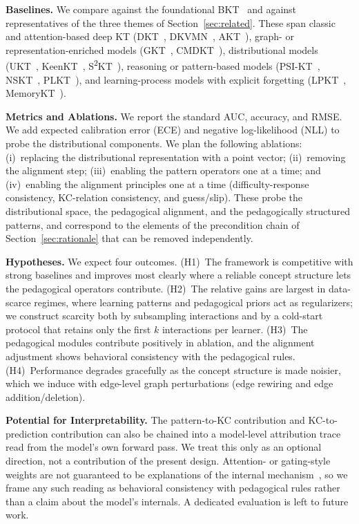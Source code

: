 \documentclass[conference]{IEEEtran}
\begin{document}
\textbf{Baselines.} We compare against the foundational BKT~\cite{corbett1994kt} and against representatives of the three themes of Section~\ref{sec:related}. These span classic and attention-based deep KT (DKT~\cite{piech2015dkt}, DKVMN~\cite{zhang2017dkvmn}, AKT~\cite{ghosh2020akt}), graph- or representation-enriched models (GKT~\cite{nakagawa2019gkt}, CMDKT~\cite{xia2025cmdkt}), distributional models (UKT~\cite{chen2025ukt}, KeenKT~\cite{li2025keenkt}, S\textsuperscript{2}KT~\cite{wu2026sskt}), reasoning or pattern-based models (PSI-KT~\cite{zhou2024psikt}, NSKT~\cite{hooshyar2026nskt}, PLKT~\cite{wu2026plkt}), and learning-process models with explicit forgetting (LPKT~\cite{shen2021lpkt}, MemoryKT~\cite{lin2025memorykt}).

\textbf{Metrics and Ablations.} We report the standard AUC, accuracy, and RMSE. We add expected calibration error (ECE) and negative log-likelihood (NLL) to probe the distributional components. We plan the following ablations: (i)~replacing the distributional representation with a point vector; (ii)~removing the alignment step; (iii)~enabling the pattern operators one at a time; and (iv)~enabling the alignment principles one at a time (difficulty-response consistency, KC-relation consistency, and guess/slip). These probe the distributional space, the pedagogical alignment, and the pedagogically structured patterns, and correspond to the elements of the precondition chain of Section~\ref{sec:rationale} that can be removed independently.

\textbf{Hypotheses.} We expect four outcomes. (H1)~The framework is competitive with strong baselines and improves most clearly where a reliable concept structure lets the pedagogical operators contribute. (H2)~The relative gains are largest in data-scarce regimes, where learning patterns and pedagogical priors act as regularizers; we construct scarcity both by subsampling interactions and by a cold-start protocol that retains only the first $k$ interactions per learner. (H3)~The pedagogical modules contribute positively in ablation, and the alignment adjustment shows behavioral consistency with the pedagogical rules. (H4)~Performance degrades gracefully as the concept structure is made noisier, which we induce with edge-level graph perturbations (edge rewiring and edge addition/deletion).

\smallskip\noindent\textbf{Potential for Interpretability.} The pattern-to-KC contribution and KC-to-prediction contribution can also be chained into a model-level attribution trace read from the model's own forward pass. We treat this only as an optional direction, not a contribution of the present design. Attention- or gating-style weights are not guaranteed to be explanations of the internal mechanism~\cite{jain2019attention,wiegreffe2019attention}, so we frame any such reading as behavioral consistency with pedagogical rules rather than a claim about the model's internals. A dedicated evaluation is left to future work.
\end{document}
